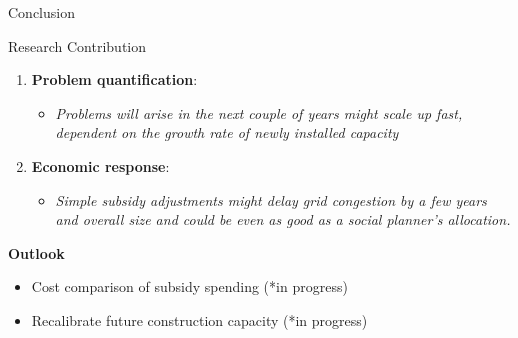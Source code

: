 \documentclass[10pt, aspectration=169]{beamer}
\begin{document}
\begin{frame}{Conclusion}
\begin{block}{Research Contribution}
    \begin{enumerate}
        \item \textbf{Problem quantification}: 
        \begin{itemize}
            \item \textcolor{unibasgreydark}{\textit{Problems will arise in the next couple of years might scale up fast, dependent on the growth rate of newly installed capacity}}
        \end{itemize}
        \vspace{0.1cm}
        \item \textbf{Economic response}: 
        \begin{itemize}
            \item \textcolor{unibasgreydark}{\textit{Simple subsidy adjustments might delay grid congestion by a few years and overall size and could be even as good as a social planner's allocation. }}
        \end{itemize}
    \end{enumerate}
\end{block}

\textbf{Outlook}
\begin{itemize}
    \item Cost comparison of subsidy spending (*in progress)
    \item Recalibrate future construction capacity (*in progress)
\end{itemize}


\end{frame}
\end{document}

